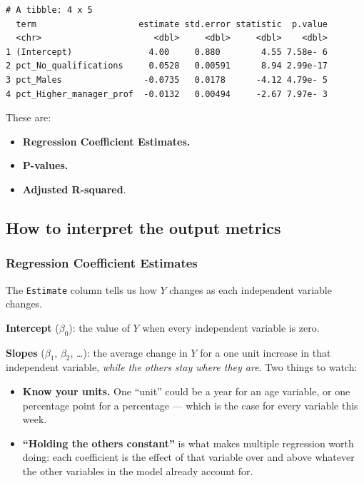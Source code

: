 \documentclass[
  letterpaper,
  DIV=11,
  numbers=noendperiod]{scrreprt}
\providecommand{\tightlist}{%
  \setlength{\itemsep}{0pt}\setlength{\parskip}{0pt}}
\begin{document}
\begin{verbatim}
# A tibble: 4 x 5
  term                    estimate std.error statistic  p.value
  <chr>                      <dbl>     <dbl>     <dbl>    <dbl>
1 (Intercept)               4.00     0.880        4.55 7.58e- 6
2 pct_No_qualifications     0.0528   0.00591      8.94 2.99e-17
3 pct_Males                -0.0735   0.0178      -4.12 4.79e- 5
4 pct_Higher_manager_prof  -0.0132   0.00494     -2.67 7.97e- 3
\end{verbatim}

These are:

\begin{itemize}
\tightlist
\item
  \textbf{Regression Coefficient Estimates.}
\item
  \textbf{P-values.}
\item
  \textbf{Adjusted R-squared}.
\end{itemize}

\subsection{How to interpret the output
metrics}\label{how-to-interpret-the-output-metrics}

\subsubsection{\texorpdfstring{\textbf{Regression} Coefficient
Estimates}{Regression Coefficient Estimates}}\label{regression-coefficient-estimates}

The \texttt{Estimate} column tells us how \(Y\) changes as each
independent variable changes.

\textbf{Intercept} (\(β_0\)): the value of \(Y\) when every independent
variable is zero.

\textbf{Slopes} (\(β_1\), \(β_2\), \ldots): the average change in \(Y\)
for a one unit increase in that independent variable, \emph{while the
others stay where they are}. Two things to watch:

\begin{itemize}
\tightlist
\item
  \textbf{Know your units.} One ``unit'' could be a year for an age
  variable, or one percentage point for a percentage --- which is the
  case for every variable this week.
\item
  \textbf{``Holding the others constant''} is what makes multiple
  regression worth doing: each coefficient is the effect of that
  variable over and above whatever the other variables in the model
  already account for.
\end{itemize}
\end{document}
